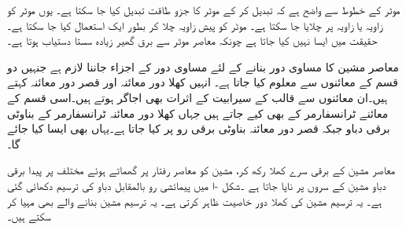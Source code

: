 موٹر کے خطوط سے واضح ہے کہ   تبدیل کر کے موٹر کا جزو طاقت تبدیل کیا جا سکتا ہے۔ یوں موٹر کو  زاویہ یا  زاویہ  پر چلایا جا سکتا ہے۔ موٹر کو پیش زاویہ چلا کر بطور ایک   استعمال کیا جا  سکتا ہے۔ حقیقت میں ایسا نہیں کیا جاتا ہے چونکہ معاصر موٹر سے برق گھیر زیادہ سستا دستیاب ہوتا ہے۔ 

معاصر مشین کا مساوی دور بنانے کے لئے مساوی دور کے اجزاء جاننا لازم ہے جنہیں دو قسم کے معائنوں سے معلوم کیا جاتا ہے۔ انہیں کھلا دور معائنہ اور قصر دور معائنہ کہتے ہیں۔ان معائنوں سے قالب کے سیرابیت کے اثرات بھی اجاگر ہوتے ہیں۔اسی قسم کے معائنے ٹرانسفارمر کے  بھی کیے جاتے ہیں جہاں  کھلا دور معائنہ ٹرانسفارمر کے بناوٹی  برقی دباو جبکہ قصر دور معائنہ بناوٹی  برقی رو پر کیا جاتا ہے۔یہاں بھی ایسا کیا جائے گا۔ 

معاصر مشین کے برقی سرے کھلا رکھ کر، مشین کو معاصر رفتار پر گھماتے ہوئے مختلف  پر پیدا برقی دباو   مشین کے سروں پر  ناپا جاتا ہے ۔شکل -ا میں پیمائشی  رو  بالمقابل دباو   کی  ترسیم  دکھائی گئی ہے۔ یہ ترسیم مشین کی کھلا دور خاصیت ظاہر کرتی ہے۔ یہ ترسیم مشین بنانے والے بھی مہیا کر سکتے ہیں۔

